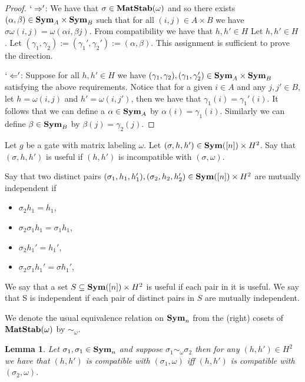 \documentclass[12pt]{report}
\newtheorem{lem}[thm]{Lemma} \newtheorem{prop}[thm]{Proposition}
\newcommand{\matstab}{\text{\textbf{MatStab}}}
\newcommand{\sym}{\text{\textbf{Sym}}}
\begin{document}
\begin{proof}
  $`\Rightarrow'$: We have that $\sigma \in \matstab(\omega)$ and so there
  exists $(\alpha, \beta) \in \sym_A \times \sym_B$ such that for all $(i,j) \in
  A \times B$ we have $\sigma \omega (i,j) = \omega (\alpha i, \beta j)$. From
  compatibility we have that $h,h' \in H$ Let $h, h' \in H$ . Let $(\gamma_1,
  \gamma_2) := (\gamma_1', \gamma_2') := (\alpha, \beta)$. This assignment is
  sufficient to prove the direction.

  $`\Leftarrow'$: Suppose for all $h,h' \in H$ we have $(\gamma_1, \gamma_2),
  (\gamma_1, \gamma_2') \in \sym_A \times \sym_B$ satisfying the above
  requirements. Notice that for a given $i \in A$ and any $j, j' \in B$, let $h
  = \omega(i,j)$ and $h' = \omega(i,j')$, then we have that $\gamma_1 (i) =
  \gamma_1'(i)$. It follows that we can define a $\alpha \in \sym_A$ by
  $\alpha(i) = \gamma_1 (i)$. Similarly we can define $\beta \in \sym_B$ by
  $\beta (j) = \gamma_2 (j)$.

\end{proof}

\begin{definition}
  Let $g$ be a gate with matrix labeling $\omega$. Let $(\sigma, h, h') \in
  \sym([n]) \times H^2$. Say that $(\sigma, h, h')$ is useful if $(h,h')$ is
  incompatible with $(\sigma, \omega)$.

  Say that two distinct pairs $(\sigma_1, h_1, h_1'), (\sigma_2, h_2, h_2') \in
  \sym([n]) \times H^2$ are mutually independent if
  \begin{itemize}
  \item $\sigma_2 h_1 = h_1$,
  \item $\sigma_2 \sigma_1 h_1 = \sigma_1 h_1$,
  \item $\sigma_2 h_1' = h_1'$,
  \item $\sigma_2 \sigma_1 h_1' = \sigma h_1'$,
  \end{itemize}
  We say that a set $S \subseteq \sym([n]) \times H^2$ is useful if each pair in
  it is useful. We say that S is independent if each pair of distinct pairs in
  $S$ are mutually independent.
\end{definition}

We denote the usual equivalence relation on $\sym_n$ from the (right) cosets of
$\matstab(\omega)$ by $\sim_\omega$.

\begin{lem}
  Let $\sigma_1, \sigma_1 \in \sym_n$ and suppose $\sigma_1 \sim_\omega
  \sigma_2$ then for any $(h,h') \in H^2$ we have that $(h,h')$ is compatible
  with $(\sigma_1, \omega)$ iff $(h,h')$ is compatible with $(\sigma_2,
  \omega)$.
\end{lem}
\end{document}
